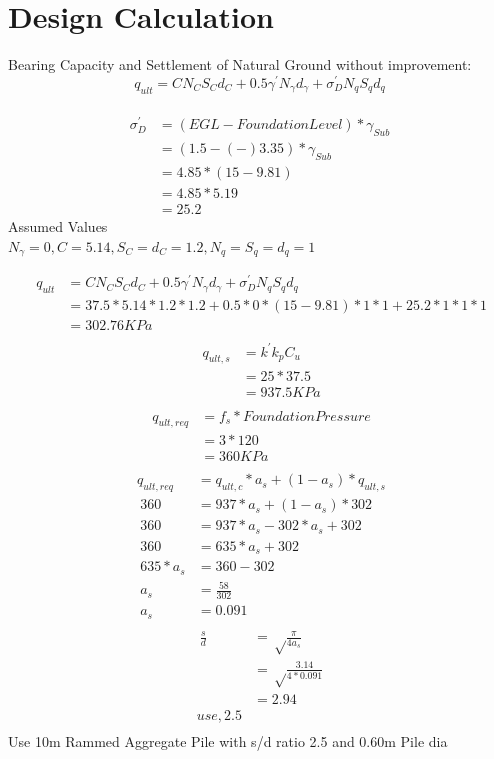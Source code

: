 \documentclass[12pt]{article}
\begin{document}
\section{Design Calculation}
Bearing Capacity and Settlement of Natural Ground without improvement:
\[q_{ult}=CN_CS_Cd_C+0.5{\gamma^'}{N_\gamma}{d_\gamma}+{\sigma_D^'}{N_q}{S_q}{d_q}\]\\
\begin{align*}
   \sigma{_D^'} &=(EGL-Foundation Level)*\gamma_{Sub}\\
  & =(1.5-(-)3.35)*\gamma_{Sub}\\
  & =4.85*(15-9.81)\\
  & =4.85*5.19\\
  & =25.2
\end{align*}
Assumed Values\\
$N_\gamma=0, C=5.14, S_C=d_C=1.2, N_q=S_q=d_q=1$

\begin{align*}
\ q_{ult} &=CN_CS_Cd_C+0.5{\gamma^'}{N_\gamma}{d_\gamma}+{\sigma_D^'}{N_q}{S_q}{d_q}\\
  & =37.5*5.14*1.2*1.2+0.5*0*(15-9.81)*1*1+25.2*1*1*1\\
  & =302.76 KPa\\
\end{align*}
\begin{align*}
\ q_{ult,s} &={k^'}{k_p}{C_u}\\\
  & =25*37.5\\
  & =937.5KPa\\
\end{align*}
\begin{align*}
\ q_{ult,req} &=f_s*{Foundation Pressure}\\\
  & =3*120\\
  & =360 KPa\\
\end{align*}
\begin{align*}
\ q_{ult,req} &=q_{ult,c}*a_s+{(1-a_s)}*q_{ult,s}\\\
\ 360 &=937*a_s+{(1-a_s)}*302\\\
\ 360 &=937*a_s-302*a_s+302\\\
\ 360 &=635*a_s+302\\\
\ 635*a_s &=360-302\\\
\ a_s &=\frac{58}{302}\\\
\ a_s &=0.091\\\
\end{align*}
\begin{align*}
\ \frac{s}{d} &=\sqrt\frac{\pi}{4a_s}\\\
  & =\sqrt\frac{3.14}{4*0.091}\\\
  & =2.94\\use,  2.5\\
\end{align*}
 Use 10m Rammed Aggregate Pile with s/d ratio 2.5 and 0.60m Pile dia
 
\end{document}
